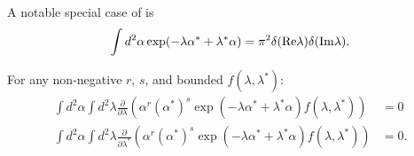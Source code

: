 A notable special case of  is
\[
	\int d^2\alpha \exp(-\lambda \alpha^* + \lambda^* \alpha)
	= \pi^2 \delta(\mathrm{Re} \lambda) \delta(\mathrm{Im} \lambda).
\]

\begin{lemma}
\label{lmm:formalism:c-numbers:zero-integrals}
For any non-negative $r$, $s$, and bounded $f(\lambda, \lambda^*)$:
\begin{equation*}
\begin{split}
	\int d^2\alpha \int d^2\lambda
		\frac{\partial}{\partial \lambda} \left(
			\alpha^r (\alpha^*)^s \exp(-\lambda \alpha^* + \lambda^* \alpha) f(\lambda, \lambda^*)
		\right)
	& = 0 \\
	\int d^2\alpha \int d^2\lambda
		\frac{\partial}{\partial \lambda^*} \left(
			\alpha^r (\alpha^*)^s \exp(-\lambda \alpha^* + \lambda^* \alpha) f(\lambda, \lambda^*)
		\right)
	& = 0.
\end{split}
\end{equation*}
\end{lemma}

